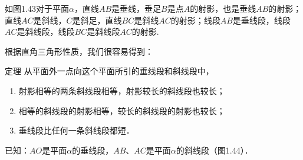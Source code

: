 \noindent
\begin{minipage}{.63\textwidth}\CTEXindent

    如图1.43对于平面$\alpha$，直线$AB$是垂线，垂足$B$是点$A$的射影，也是垂线$AB$的射影；直线$AC$是斜线，$C$是斜足，直线$BC$是斜线$AC$的射影；线段$AB$是垂线段，线段$AC$是斜线段，线段$BC$是斜线段$AC$的射影.

    根据直角三角形性质，我们很容易得到：
\end{minipage}
\hfill
\begin{minipage}{.35\textwidth}
\centering
{}
\end{minipage}




\begin{thm}
{定理} 从平面外一点向这个平面所引的垂线段和斜线段中，
\begin{enumerate}[(1)]
\item 射影相等的两条斜线段相等，射影较长的斜线段也较长；
\item 相等的斜线段的射影相等，较长的斜线段的射影也较长；
\item 垂线段比任何一条斜线段都短．    
\end{enumerate}
\end{thm}

已知：$AO$是平面$\alpha$的垂线段，$AB$、$AC$是平面$\alpha$的斜线段（图1.44）．

